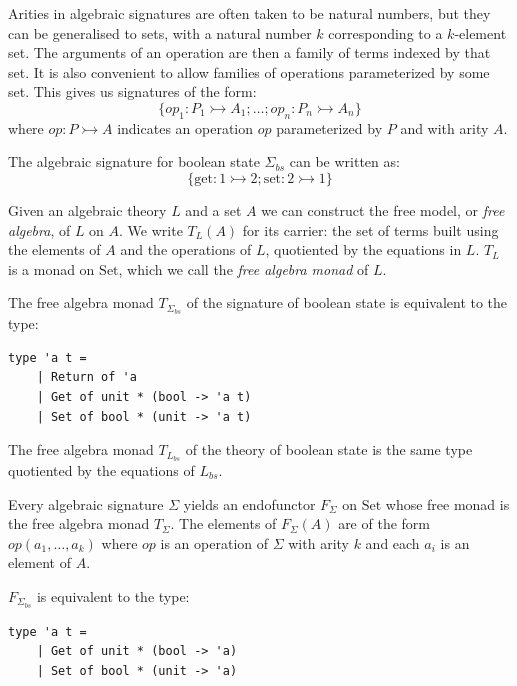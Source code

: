 \documentclass[acmsmall, screen, review, anonymous]{acmart}
\theoremstyle{definition}
\newcommand{\setc}{\mathrm{Set}}
\newcommand{\types}{\mathrel{:}}
\begin{document}
Arities in algebraic signatures are often taken to be natural numbers,
but they can be generalised to sets, with a natural number $k$
corresponding to a $k$-element set. The arguments of an operation are
then a family of terms indexed by that set. It is also convenient to allow
families of operations parameterized by some set. This gives us
signatures of the form:
\begin{equation*}
\{ op_1 \types P_1 \rightarrowtail A_1; \ldots; op_n
\types P_n \rightarrowtail A_n \}
\end{equation*}
where $op \types P \rightarrowtail A$ indicates an operation $op$
parameterized by $P$ and with arity $A$.

\begin{example}
  The algebraic signature for boolean state $\Sigma_{bs}$ can be written
  as:
  \begin{equation*}
    \{ \mathrm{get} \types 1 \rightarrowtail 2; \mathrm{set} \types 2 \rightarrowtail 1 \}
  \end{equation*}
\end{example}

Given an algebraic theory $L$ and a set $A$ we can construct the free
model, or \emph{free algebra}, of $L$ on $A$. We write $T_L(A)$ for its
carrier: the set of terms built using the elements of $A$ and the
operations of $L$, quotiented by the equations in $L$.  $T_L$ is a monad
on $\setc$, which we call the \emph{free algebra monad} of $L$.

\begin{example}
  The free algebra monad $T_{\Sigma_{bs}}$ of the signature of boolean
  state is equivalent to the type:
  \begin{lstlisting}[style=oxcaml]
  type 'a t =
    | Return of 'a
    | Get of unit * (bool -> 'a t)
    | Set of bool * (unit -> 'a t)
  \end{lstlisting}
  The free algebra monad $T_{L_{bs}}$ of the theory of boolean state is
  the same type quotiented by the equations of $L_{bs}$.
\end{example}

Every algebraic signature $\Sigma$ yields an endofunctor $F_{\Sigma}$ on
$\setc$ whose free monad is the free algebra monad $T_{\Sigma}$. The
elements of $F_{\Sigma}(A)$ are of the form $op(a_1, \ldots, a_k)$ where $op$ is an operation of
$\Sigma$ with arity $k$ and each $a_i$ is an element of $A$.
\begin{example}
  $F_{\Sigma_{bs}}$ is equivalent to the type:
  \begin{lstlisting}[style=oxcaml]
  type 'a t =
    | Get of unit * (bool -> 'a)
    | Set of bool * (unit -> 'a)
  \end{lstlisting}
\end{example}
\end{document}
